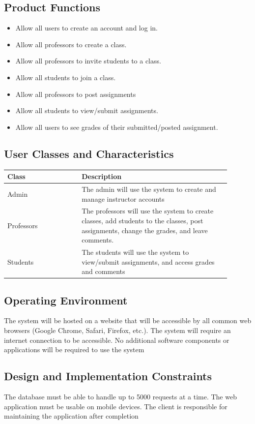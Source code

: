 \documentclass{article}
\begin{document}
\subsection{Product Functions}
\begin{itemize}
  \item Allow all users to create an account and log in.
  \item Allow all professors to create a class.
  \item Allow all professors to invite students to a class.
  \item Allow all students to join a class.
  \item Allow all professors to post assignments
  \item Allow all students to view/submit assignments.
  \item Allow all users to see grades of their submitted/posted assignment.
\end{itemize}

\subsection{User Classes and Characteristics}

\begin{tabular}{| p{0.3\linewidth} | p{0.6\linewidth} |}
  \hline
  \textbf{Class} & \textbf{Description} \\
  \hline
  \hline
  Admin & The admin will use the system to create and manage instructor accounts \\
  \hline
  Professors & The professors will use the system to create classes, add students to the classes, post assignments, change the grades, and leave comments.\\
  \hline
  Students & The students will use the system to view/submit assignments, and access grades and comments\\
  \hline
\end{tabular}


\subsection{Operating Environment}
The system will be hosted on a website that will be accessible by all common web browsers (Google Chrome, Safari, Firefox, etc.). The system will require an internet connection to be accessible. No additional software components or applications will be required to use the system

\subsection{Design and Implementation Constraints}
The database must be able to handle up to 5000 requests at a time.
The web application must be usable on mobile devices.
The client is responsible for maintaining the application after completion
\end{document}
